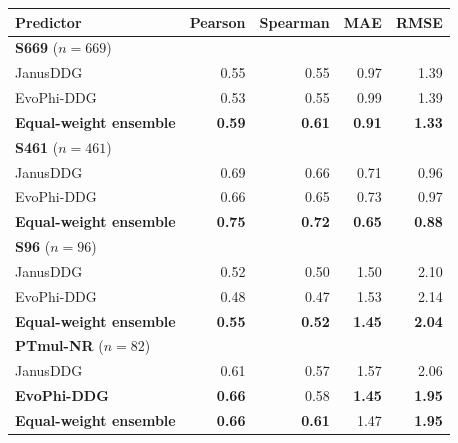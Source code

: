 \begin{tabular}{lrrrr}\toprule
Predictor & Pearson & Spearman & MAE & RMSE\\\midrule
\multicolumn{5}{l}{\textbf{S669} ($n=669$)} \\
JanusDDG & 0.55 & 0.55 & 0.97 & 1.39 \\
EvoPhi-DDG & 0.53 & 0.55 & 0.99 & 1.39 \\
\textbf{Equal-weight ensemble} & \textbf{0.59} & \textbf{0.61} & \textbf{0.91} & \textbf{1.33} \\
\midrule
\multicolumn{5}{l}{\textbf{S461} ($n=461$)} \\
JanusDDG & 0.69 & 0.66 & 0.71 & 0.96 \\
EvoPhi-DDG & 0.66 & 0.65 & 0.73 & 0.97 \\
\textbf{Equal-weight ensemble} & \textbf{0.75} & \textbf{0.72} & \textbf{0.65} & \textbf{0.88} \\
\midrule
\multicolumn{5}{l}{\textbf{S96} ($n=96$)} \\
JanusDDG & 0.52 & 0.50 & 1.50 & 2.10 \\
EvoPhi-DDG & 0.48 & 0.47 & 1.53 & 2.14 \\
\textbf{Equal-weight ensemble} & \textbf{0.55} & \textbf{0.52} & \textbf{1.45} & \textbf{2.04} \\
\midrule
\multicolumn{5}{l}{\textbf{PTmul-NR} ($n=82$)} \\
JanusDDG & 0.61 & 0.57 & 1.57 & 2.06 \\
\textbf{EvoPhi-DDG} & \textbf{0.66} & 0.58 & \textbf{1.45} & \textbf{1.95} \\
\textbf{Equal-weight ensemble} & \textbf{0.66} & \textbf{0.61} & 1.47 & \textbf{1.95} \\
\bottomrule\end{tabular}
